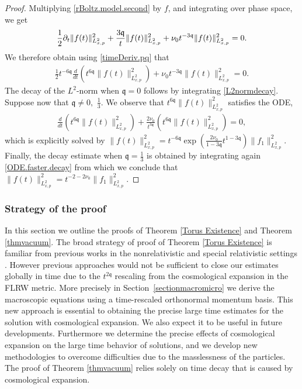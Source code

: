 \documentclass[reqno]{amsart}
\newcommand{\secref}[1]{Section~\ref{#1}}
\newcommand{\qq}{\mathfrak{q}}
\newcommand{\tqq}{t^{2\qq}}
\theoremstyle{definition}
\numberwithin{equation}{section}
\numberwithin{theorem}{section}
\begin{document}
\begin{proof} Multiplying \eqref{rBoltz.model.second} by $f$, and integrating over phase space, we get
\begin{gather}\notag
   \frac{1}{2}\partial_t \| f(t)\|_{L^2_{x,p}}^2
    +\frac{3\qq }{t} \| f(t) \|_{L^2_{x,p}}^2
    +
    \nu_0t^{-3\qq} \| f(t) \|_{L^2_{x,p}}^2
=
0.
\end{gather}
We therefore obtain using \eqref{timeDeriv.pq} that
\begin{gather}\label{L2normdecay}
  \frac{1}{2} t^{-6\qq} \frac{d}{d t}\left( t^{6\qq} \| f(t)\|_{L^2_{x,p}}^2 \right)
    +
    \nu_0t^{-3\qq} \| f(t) \|_{L^2_{x,p}}^2
=
0.
\end{gather}
The decay of the \(L^2\)-norm when \(\qq=0\) follows by integrating \eqref{L2normdecay}. Suppose now that \(\qq \neq 0,\) \(\frac{1}{3}\). We observe that $t^{6\qq}\|f(t)\|_{L^2_{x,p}}^2$ satisfies the ODE,
\begin{align}\label{ODE.faster.decay}
      \frac{d}{d t}\left( t^{6\qq} \| f(t)\|_{L^2_{x,p}}^2 \right)
    +
    \frac{2\nu_0}{t^{3\qq}} \left( t^{6\qq} \| f(t)\|_{L^2_{x,p}}^2 \right)
=
0,
\end{align}
which is explicitly solved by $\|f(t)\|_{L^2_{x,p}}^2=t^{-6\qq}\exp(\frac{2\nu_0}{1-3\qq}t^{1-3\qq})\|f_1\|_{L^2_{x,p}}^2.$ Finally, the decay estimate when $\qq = \frac{1}{3}$ is obtained by integrating again \eqref{ODE.faster.decay} from which we conclude that \(\|f(t)\|_{L^2_{x,p}}^2=t^{-2-2\nu_0}\|f_1\|_{L^2_{x,p}}^2.\)
\end{proof}


\subsubsection{Strategy of the proof}\label{subsecstratproof}

In this section we outline the proofs of Theorem \ref{Torus Existence} and Theorem \ref{thmvacuum}. The broad strategy of proof of Theorem \ref{Torus Existence} is familiar from previous works in the nonrelativistic and special relativistic settings \cite{MR1211782, 1904.12086}.  However previous approaches would not be sufficient to close our estimates globally in time due to the $\tqq$ rescaling from the cosmological expansion in the FLRW metric.  More precisely in \secref{sectionmacromicro} we derive the macroscopic equations using a  time-rescaled orthonormal momentum basis.  This new approach is essential to obtaining the precise large time estimates for the solution with cosmological expansion.  We also expect it to be useful in future developments.  Furthermore we determine the precise effects of cosmological expansion on the large time behavior of solutions, and we develop new methodologies to overcome difficulties due to the masslessness of the particles. The proof of Theorem \ref{thmvacuum} relies solely on time decay that is caused by cosmological expansion.
\end{document}
